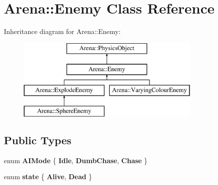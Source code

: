 \hypertarget{class_arena_1_1_enemy}{\section{Arena\+:\+:Enemy Class Reference}
\label{class_arena_1_1_enemy}
}
Inheritance diagram for Arena\+:\+:Enemy\+:\begin{figure}[H]
\begin{center}
\leavevmode
\includegraphics[height=4.000000cm]{class_arena_1_1_enemy}
\end{center}
\end{figure}
\subsection*{Public Types}
\begin{DoxyCompactItemize}
\item 
\hypertarget{class_arena_1_1_enemy_af5ced89684887a3cdccdfc22ab51b77b}{enum {\bfseries A\+I\+Mode} \{ {\bfseries Idle}, 
{\bfseries Dumb\+Chase}, 
{\bfseries Chase}
 \}}\label{class_arena_1_1_enemy_af5ced89684887a3cdccdfc22ab51b77b}

\item 
\hypertarget{class_arena_1_1_enemy_abecbeb25d89a5953bad561cdb3cec90a}{enum {\bfseries state} \{ {\bfseries Alive}, 
{\bfseries Dead}
 \}}\label{class_arena_1_1_enemy_abecbeb25d89a5953bad561cdb3cec90a}

\end{DoxyCompactItemize}
